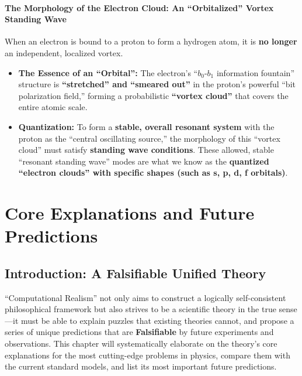 \documentclass[11pt, a4paper]{article}
\begin{document}
\paragraph{The Morphology of the Electron Cloud: An ``Orbitalized'' Vortex Standing Wave}

When an electron is bound to a proton to form a hydrogen atom, it is \textbf{no longer} an independent, localized vortex.

\begin{itemize}
    \item \textbf{The Essence of an ``Orbital'':} The electron's ``$b_0$-$b_1$ information fountain'' structure is \textbf{``stretched'' and ``smeared out''} in the proton's powerful ``bit polarization field,'' forming a probabilistic \textbf{``vortex cloud''} that covers the entire atomic scale.
    \item \textbf{Quantization:} To form a \textbf{stable, overall resonant system} with the proton as the ``central oscillating source,'' the morphology of this ``vortex cloud'' must satisfy \textbf{standing wave conditions}. These allowed, stable ``resonant standing wave'' modes are what we know as the \textbf{quantized ``electron clouds'' with specific shapes (such as s, p, d, f orbitals)}.
\end{itemize}












\section{Core Explanations and Future Predictions}

\subsection{Introduction: A Falsifiable Unified Theory}

``Computational Realism'' not only aims to construct a logically self-consistent philosophical framework but also strives to be a scientific theory in the true sense—it must be able to explain puzzles that existing theories cannot, and propose a series of unique predictions that are \textbf{Falsifiable} by future experiments and observations. This chapter will systematically elaborate on the theory's core explanations for the most cutting-edge problems in physics, compare them with the current standard models, and list its most important future predictions.
\end{document}
